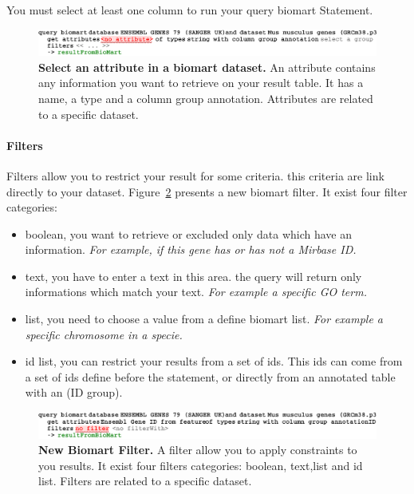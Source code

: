 \begin{remark}
You must select at least one column to run your query biomart Statement.
\end{remark}

 \begin{figure}[h!tbp]
  \centering
  \includegraphics[width=\figWidthWide]{figures/BiomartAttribute.pdf}
\caption[Select an attribute in a biomart dataset.]{\textbf{Select an attribute in a biomart dataset.} An attribute contains any information you want to retrieve on your result table. It has a name, a type and a column group annotation. Attributes are related to a specific dataset.}
\label{fig:attributeBiomart}
\end{figure}
\paragraph{Filters}
Filters allow you to restrict your result for some criteria. this criteria are link directly to your dataset. Figure~\ref{fig:BiomartFilter} presents a new biomart filter. It exist four filter categories: 
\begin{itemize}
\item boolean, you want to retrieve or excluded only data which have an information. \textit{For example, if this gene has or has not a Mirbase ID.}
\item text, you have to enter a text in this area. the query will return only informations which match your text. \textit{For example  a specific GO term.}
\item list,  you need to choose a value from a define biomart list. \textit{For example a specific chromosome in a specie.}
\item id list, you can restrict your results from a set of ids. This ids can come from a set of ids define before the statement, or directly from an annotated table with an (ID group).  
\end{itemize}

 \begin{figure}[h!tbp]
  \centering
  \includegraphics[width=\figWidthWide]{figures/BiomartFilter.pdf}
\caption[New Biomart Filter]{\textbf{New Biomart Filter.} A filter allow you to apply constraints to you results. It exist four filters categories: boolean, text,list and id list. Filters are related to a specific dataset.}
\label{fig:BiomartFilter}
\end{figure}

